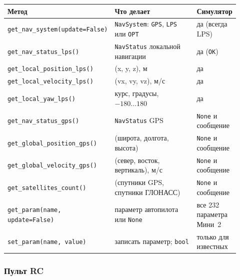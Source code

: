 {\footnotesize
\begin{longtable}{@{}>{\raggedright\arraybackslash}p{0.42\linewidth}>{\raggedright\arraybackslash}p{0.36\linewidth}>{\raggedright\arraybackslash}p{0.14\linewidth}@{}}
\toprule
\textbf{Метод} & \textbf{Что делает} & \textbf{Симулятор} \\
\midrule
\endhead
\verb|get_nav_system(update=False)| & \verb|NavSystem|: \verb|GPS|, \verb|LPS| или \verb|OPT| & да (всегда LPS) \\
\verb|get_nav_status_lps()| & \verb|NavStatus| локальной навигации & да (\verb|OK|) \\
\verb|get_local_position_lps()| & (x, y, z), м & да \\
\verb|get_local_velocity_lps()| & (vx, vy, vz), м/с & да \\
\verb|get_local_yaw_lps()| & курс, градусы, $-180\ldots180$ & да \\
\verb|get_nav_status_gps()| & \verb|NavStatus| GPS & \verb|None| и сообщение \\
\verb|get_global_position_gps()| & (широта, долгота, высота) & \verb|None| и сообщение \\
\verb|get_global_velocity_gps()| & (север, восток, вертикаль), м/с & \verb|None| и сообщение \\
\verb|get_satellites_count()| & (спутники GPS, спутники ГЛОНАСС) & \verb|None| и сообщение \\
\verb|get_param(name, update=False)| & параметр автопилота или \verb|None| & все 232 параметра Мини~2 \\
\verb|set_param(name, value)| & записать параметр; \verb|bool| & только для известных \\
\bottomrule
\end{longtable}
}

\subsubsection*{Пульт RC}

